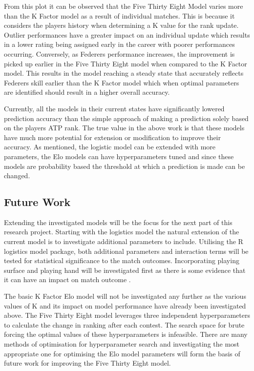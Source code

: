 \documentclass[12pt,a4paper]{article}
\begin{document}
From this plot it can be observed that the Five Thirty Eight Model varies more than the
K Factor model as a result of individual matches. This is because it considers the players
history when determining a K value for the rank update. Outlier performances have a greater
impact on an individual update which results in a lower rating being assigned early in the
career with poorer performances occurring. Conversely, as Federers performance increases,
the improvement is picked up earlier in the Five Thirty Eight model when compared to the
K Factor model. This results in the model reaching a steady state that accurately reflects
Federers skill earlier than the K Factor model which when optimal parameters are identified
should result in a higher overall accuracy.

Currently, all the models in their current states have significantly lowered prediction accuracy
than the simple approach of making a prediction solely based on the players ATP rank.
The true value in the above work is that these models have much more potential for extension
or modification to improve their accuracy. As mentioned, the logistic model can be
extended with more parameters, the Elo models can have hyperparameters tuned and since
these models are probability based the threshold at which a prediction is made can be
changed.

\subsection{Future Work}
Extending the investigated models will be the focus for the next part of this research
project. Starting with the logistics model the natural extension of the current model
is to investigate additional parameters to include. Utilising the R logistics model
package, both additional parameters and interaction terms will be tested for statistical
significance to the match outcomes. Incorporating playing surface and playing hand will
be investigated first as there is some evidence that it can have an impact on match
outcome \cite{loffing_left-handedness_2012}.

The basic K Factor Elo model will not be investigated any further as the various values
of K and its impact on model performance have already been investigated above. The Five
Thirty Eight model leverages three independent hyperparameters to calculate the change
in ranking after each contest. The search space for brute forcing the optimal values of
these hyperparameters is infeasible. There are many methods of optimisation for
hyperparameter search \cite{claesen_hyperparameter_2015} and investigating the
most appropriate one for optimising the Elo model parameters will form the basis of
future work for improving the Five Thirty Eight model.
\end{document}
